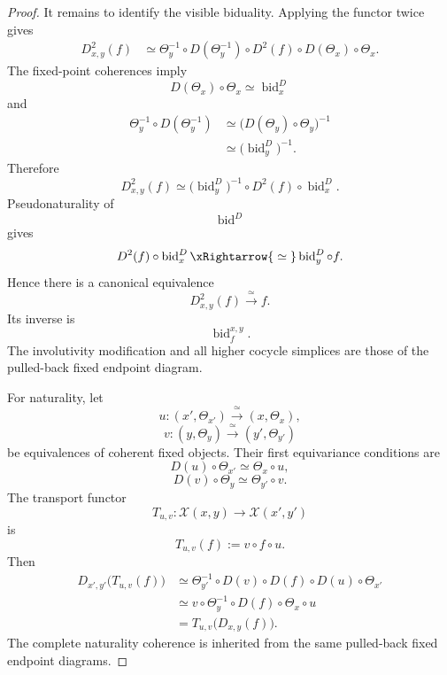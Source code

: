 \begin{proof}
It remains to identify the visible biduality. Applying the functor twice
gives
\[
\begin{aligned}
    D_{x,y}^2(f)
    &\simeq
    \Theta_y^{-1}
    \circ
    D(\Theta_y^{-1})
    \circ
    D^2(f)
    \circ
    D(\Theta_x)
    \circ
    \Theta_x.
\end{aligned}
\]
The fixed-point coherences imply
\[
    D(\Theta_x)\circ\Theta_x
    \simeq
    \operatorname{bid}^{D}_x
\]
and
\[
\begin{aligned}
    \Theta_y^{-1}\circ D(\Theta_y^{-1})
    &\simeq
    \bigl(
        D(\Theta_y)\circ\Theta_y
    \bigr)^{-1}
    \\
    &\simeq
    \bigl(
        \operatorname{bid}^{D}_y
    \bigr)^{-1}.
\end{aligned}
\]
Therefore
\[
    D_{x,y}^2(f)
    \simeq
    \bigl(
        \operatorname{bid}^{D}_y
    \bigr)^{-1}
    \circ
    D^2(f)
    \circ
    \operatorname{bid}^{D}_x.
\]
Pseudonaturality of
\[
    \operatorname{bid}^{D}
\]
gives
\[
    D^2(f)
    \circ
    \operatorname{bid}^{D}_x
    \xRightarrow{\;\simeq\;}
    \operatorname{bid}^{D}_y
    \circ
    f.
\]
Hence there is a canonical equivalence
\[
    D_{x,y}^2(f)
    \xrightarrow{\;\simeq\;}
    f.
\]
Its inverse is
\[
    \operatorname{bid}^{x,y}_f.
\]
The involutivity modification and all higher cocycle simplices are those
of the pulled-back fixed endpoint diagram.

For naturality, let
\[
    u
    \colon
    (x',\Theta_{x'})
    \xrightarrow{\;\simeq\;}
    (x,\Theta_x),
\]
\[
    v
    \colon
    (y,\Theta_y)
    \xrightarrow{\;\simeq\;}
    (y',\Theta_{y'})
\]
be equivalences of coherent fixed objects. Their first equivariance
conditions are
\[
    D(u)\circ\Theta_{x'}
    \simeq
    \Theta_x\circ u,
\]
\[
    D(v)\circ\Theta_y
    \simeq
    \Theta_{y'}\circ v.
\]
The transport functor
\[
    T_{u,v}
    \colon
    \mathcal X(x,y)
    \longrightarrow
    \mathcal X(x',y')
\]
is
\[
    T_{u,v}(f)
    :=
    v\circ f\circ u.
\]
Then
\[
\begin{aligned}
    D_{x',y'}
    \bigl(
        T_{u,v}(f)
    \bigr)
    &\simeq
    \Theta_{y'}^{-1}
    \circ
    D(v)
    \circ
    D(f)
    \circ
    D(u)
    \circ
    \Theta_{x'}
    \\
    &\simeq
    v
    \circ
    \Theta_y^{-1}
    \circ
    D(f)
    \circ
    \Theta_x
    \circ
    u
    \\
    &=
    T_{u,v}
    \bigl(
        D_{x,y}(f)
    \bigr).
\end{aligned}
\]
The complete naturality coherence is inherited from the same pulled-back
fixed endpoint diagrams.
\end{proof}


